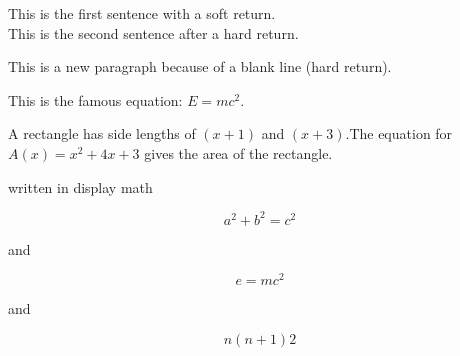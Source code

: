 \documentclass[14pt]{article}             %
\begin{document}
This is the first sentence with a soft return.\\   %
This is the second sentence after a hard return.

This is a new paragraph because of a blank line (hard return).   %

This is the famous equation: $E = mc^2$.           %

A rectangle has side lengths of $(x+1)$ and $(x+3)$.The equation for ${A(x)=x^2+4x+3}$ gives the area of the rectangle.  

written in display math

\[
a^2 + b^2 = c^2
\]

and

\begin{equation}
e=mc^2
\end{equation}

and 

$$
{n(n+1)}{2}
$$
\end{document}
